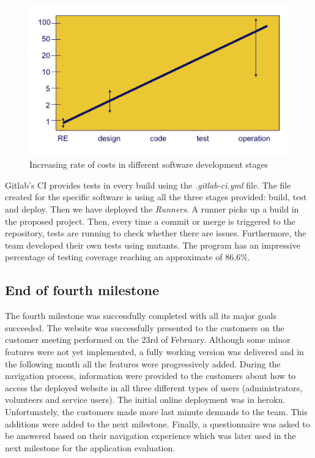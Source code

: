 \documentclass{l3proj}
\begin{document}
\begin{figure}[h]
\centerline{\includegraphics[width=\textwidth, height=\textheight, keepaspectratio]{costOfErrors.png}}
\caption{Increasing rate of costs in different software development stages }
\label{fig:errors}
\end{figure}

Gitlab's CI provides tests in every build using the \textit{.gitlab-ci.yml} file. The file created for the specific software is using all the three stages provided: build, test and deploy. Then we have deployed the \textit{Runners}. A runner picks up a build in the proposed project. Then, every time a commit or merge is triggered to the repository, tests are running to check whether there are issues. Furthermore, the team developed their own tests using mutants. The program has an impressive percentage of testing coverage reaching an approximate of 86.6\%.


\subsection{End of fourth milestone}
\label{sec:milestone4}

The fourth milestone was successfully completed with all its major goals succeeded. The website was successfully presented to the customers on the customer meeting performed on the 23rd of February. Although some minor features were not yet implemented, a fully working version was delivered and in the following month all the features were progressively added. During the navigation process, information were provided to the customers about how to access the deployed website in all three different types of users (administrators, volunteers and service users). The initial online deployment was in heroku. Unfortunately, the customers made more last minute demands to the team. This additions were added to the next milestone. Finally, a questionnaire was asked to be answered based on their navigation experience which was later used in the next milestone for the application evaluation. 
\end{document}
